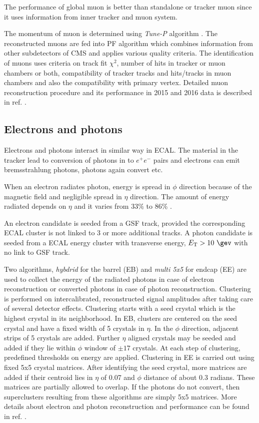 The performance of global muon is better than standalone or tracker muon since it uses information from inner tracker and muon system.

The momentum of muon is determined using \textit{Tune-P} algorithm \cite{Chatrchyan:2012xi}. The reconstructed muons are fed into PF algorithm which combines information from other subdetectors of CMS and applies various quality criteria. The identification of muons uses criteria on track fit $\chi^2$, number of hits in tracker or muon chambers or both, compatibility of tracker tracks and hits/tracks in muon chambers and also the  compatibility with primary vertex. Detailed muon reconstruction procedure and its performance in 2015 and 2016 data is described in ref. \cite{Sirunyan:2018fpa}.

\subsection{Electrons and photons}
Electrons and photons interact in similar way in ECAL. The material in the tracker lead to conversion of photons in to $e^+e^-$ pairs and electrons can emit bremsstrahlung photons, photons again convert etc.

When an electron radiates photon, energy is spread in $\phi$ direction because of the magnetic field and negligible spread in $\eta$ direction. The amount of energy radiated depends on $\eta$ and it varies from 33\% to 86\% \cite{Khachatryan:2015hwa}.

An electron candidate is seeded from a GSF track, provided the corresponding ECAL cluster is not linked to 3 or more additional tracks. A photon candidate is seeded from a ECAL energy cluster with transverse energy, $\et > 10\ \gev$ with no link to GSF track.

Two algorithms, \textit{hybdrid} for the barrel (EB) and \textit{multi 5x5} for endcap (EE) \cite{Khachatryan:2015hwa} are used to collect the energy of the radiated photons in case of electron reconstruction or converted photons in case of photon reconstruction. Clustering is performed  on intercalibrated, reconstructed signal amplitudes after taking care of several detector effects. Clustering starts with a seed crystal which is the highest \et crystal in its neighborhood. In EB, clusters are centered on the seed crystal and have a fixed width of 5 crystals in $\eta$. In the $\phi$ direction, adjacent strips of 5 crystals are added. Further $\eta$ aligned crystals may be seeded and added if they lie within $\phi$ window of $\pm17$ crystals. At each step of clustering, predefined thresholds on energy are applied. Clustering in EE is carried out using fixed 5x5 crystal matrices. After identifying the seed crystal, more matrices are added if their centroid lies in  $\eta$ of 0.07 and $\phi$ distance of about 0.3 radians. These matrices are partially allowed to overlap. If the photons do not convert, then superclusters resulting from these algorithms are simply 5x5 matrices. More details about electron and photon reconstruction and performance can be found in ref. \cite{Khachatryan:2015hwa,CMS:EGM-14-001}.

